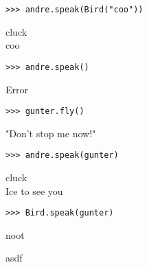 \newpage
\begin{blocksection}
\vspace{9\baselineskip}
\begin{lstlisting}
>>> andre.speak(Bird("coo"))
\end{lstlisting}
\begin{solution}[.2in]
cluck \\
coo
\end{solution}

\vspace{3\baselineskip}
\begin{lstlisting}
>>> andre.speak()
\end{lstlisting}
\begin{solution}[.2in]
Error
\end{solution}

\vspace{3\baselineskip}
\begin{lstlisting}
>>> gunter.fly()
\end{lstlisting}
\begin{solution}[.2in]
"Don't stop me now!"
\end{solution}

\vspace{3\baselineskip}
\begin{lstlisting}
>>> andre.speak(gunter)
\end{lstlisting}
\begin{solution}[.2in]
cluck \\
Ice to see you
\end{solution}

\vspace{3\baselineskip}
\begin{lstlisting}
>>> Bird.speak(gunter)
\end{lstlisting}
\begin{solution}[.2in]
noot
\end{solution}

asdf
\end{blocksection}
\onecolumn

